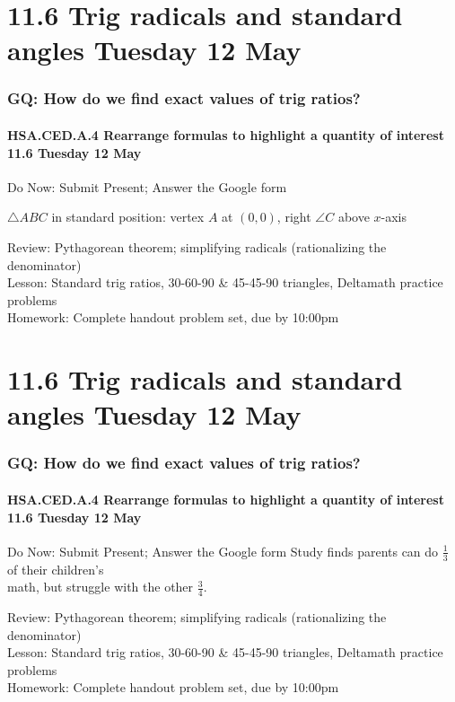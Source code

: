 \documentclass{beamer}
\begin{document}
\section{11.6 Trig radicals and standard angles Tuesday 12 May} 
\frame
{
  \frametitle{GQ: How do we find exact values of trig ratios?}
  \framesubtitle{HSA.CED.A.4 Rearrange formulas to highlight a quantity of interest \hfill \alert{11.6 Tuesday 12 May}}

  \begin{block}{Do Now: Submit Present; Answer the Google form} %
    \begin{multicols}{2}
      $\triangle ABC$ in standard position: vertex $A$ at $(0,0)$, right $\angle C$ above $x$-axis
  \end{multicols}
    \end{block}
    Review: Pythagorean theorem; simplifying radicals (rationalizing the denominator)\\[0.20cm]
    Lesson: Standard trig ratios, 30-60-90 \& 45-45-90 triangles,
    Deltamath practice problems \\[0.20cm]
    Homework: Complete handout problem set, due by 10:00pm
    }

    \section{11.6 Trig radicals and standard angles Tuesday 12 May} 
    \frame
    {
      \frametitle{GQ: How do we find exact values of trig ratios?}
      \framesubtitle{HSA.CED.A.4 Rearrange formulas to highlight a quantity of interest \hfill \alert{11.6 Tuesday 12 May}}
    
      \begin{block}{Do Now: Submit Present; Answer the Google form} \vspace{0.5cm}
        \Large{
          Study finds parents can do $\frac{1}{3}$ of their children's \\[0.25cm] math, but struggle with the other $\frac{3}{4}$.
        }
        \end{block} \vspace{0.5cm}
        Review: Pythagorean theorem; simplifying radicals (rationalizing the denominator)\\[0.20cm]
        Lesson: Standard trig ratios, 30-60-90 \& 45-45-90 triangles,
        Deltamath practice problems \\[0.20cm]
        Homework: Complete handout problem set, due by 10:00pm
    }
\end{document}
